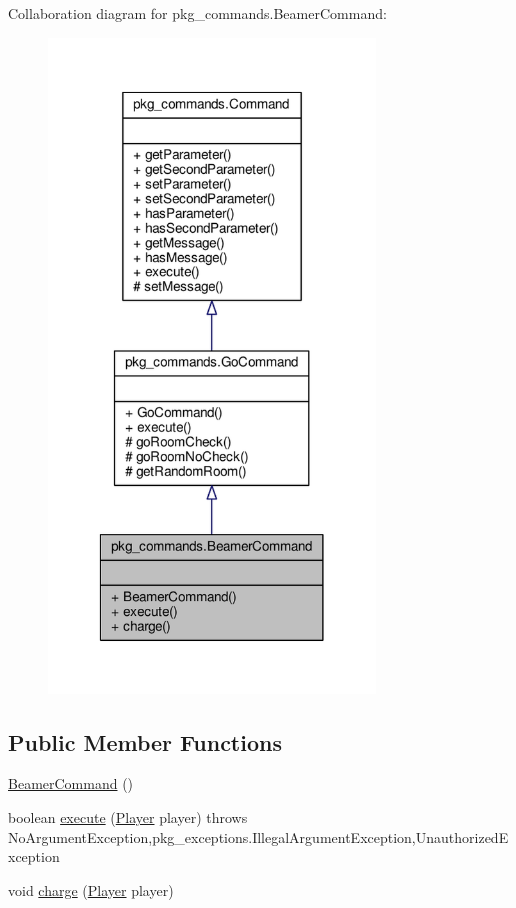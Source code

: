 Collaboration diagram for pkg\-\_\-commands.\-Beamer\-Command\-:
\nopagebreak
\begin{figure}[H]
\begin{center}
\leavevmode
\includegraphics[width=246pt]{classpkg__commands_1_1BeamerCommand__coll__graph}
\end{center}
\end{figure}
\subsection*{Public Member Functions}
\begin{DoxyCompactItemize}
\item 
\hyperlink{classpkg__commands_1_1BeamerCommand_a541cd046e7680452f451322c1730e675}{Beamer\-Command} ()
\item 
boolean \hyperlink{classpkg__commands_1_1BeamerCommand_a139dc852e180cabd8af15cfed37dcf0e}{execute} (\hyperlink{classpkg__world_1_1Player}{Player} player)  throws No\-Argument\-Exception,pkg\-\_\-exceptions.\-Illegal\-Argument\-Exception,\-Unauthorized\-Exception 
\item 
void \hyperlink{classpkg__commands_1_1BeamerCommand_ae71665296a18d581ad1f714c1078e37b}{charge} (\hyperlink{classpkg__world_1_1Player}{Player} player)
\end{DoxyCompactItemize}
